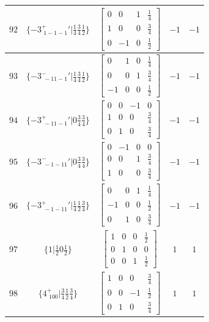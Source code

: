 \documentclass[fleqn,8pt]{jsarticle}
\begin{document}
\begin{longtable}{ccccc}
$ 92 $ & $ \{-3^{+}_{\,\,1-1-1}{}'|\frac{1}{4} \frac{3}{4} \frac{1}{2}\} $ & $ \begin{bmatrix} 0 & 0 & 1 & \frac{1}{4} \\ 1 & 0 & 0 & \frac{3}{4} \\ 0 & -1 & 0 & \frac{1}{2} \end{bmatrix} $ & $ -1 $ & $ -1 $ \\ \hline
$ 93 $ & $ \{-3^{-}_{\,\,-11-1}{}'|\frac{1}{4} \frac{3}{4} \frac{1}{2}\} $ & $ \begin{bmatrix} 0 & 1 & 0 & \frac{1}{4} \\ 0 & 0 & 1 & \frac{3}{4} \\ -1 & 0 & 0 & \frac{1}{2} \end{bmatrix} $ & $ -1 $ & $ -1 $ \\ \hline
$ 94 $ & $ \{-3^{+}_{\,\,-11-1}{}'|0 \frac{3}{4} \frac{3}{4}\} $ & $ \begin{bmatrix} 0 & 0 & -1 & 0 \\ 1 & 0 & 0 & \frac{3}{4} \\ 0 & 1 & 0 & \frac{3}{4} \end{bmatrix} $ & $ -1 $ & $ -1 $ \\ \hline
$ 95 $ & $ \{-3^{-}_{\,\,-1-11}{}'|0 \frac{3}{4} \frac{3}{4}\} $ & $ \begin{bmatrix} 0 & -1 & 0 & 0 \\ 0 & 0 & 1 & \frac{3}{4} \\ 1 & 0 & 0 & \frac{3}{4} \end{bmatrix} $ & $ -1 $ & $ -1 $ \\ \hline
$ 96 $ & $ \{-3^{+}_{\,\,-1-11}{}'|\frac{1}{4} \frac{1}{2} \frac{3}{4}\} $ & $ \begin{bmatrix} 0 & 0 & 1 & \frac{1}{4} \\ -1 & 0 & 0 & \frac{1}{2} \\ 0 & 1 & 0 & \frac{3}{4} \end{bmatrix} $ & $ -1 $ & $ -1 $ \\ \hline
$ 97 $ & $ \{1|\frac{1}{2} 0 \frac{1}{2}\} $ & $ \begin{bmatrix} 1 & 0 & 0 & \frac{1}{2} \\ 0 & 1 & 0 & 0 \\ 0 & 0 & 1 & \frac{1}{2} \end{bmatrix} $ & $ 1 $ & $ 1 $ \\ \hline
$ 98 $ & $ \{4^{+}_{\,\,100}|\frac{3}{4} \frac{1}{2} \frac{3}{4}\} $ & $ \begin{bmatrix} 1 & 0 & 0 & \frac{3}{4} \\ 0 & 0 & -1 & \frac{1}{2} \\ 0 & 1 & 0 & \frac{3}{4} \end{bmatrix} $ & $ 1 $ & $ 1 $ \\ \hline

\end{longtable}
\end{document}
